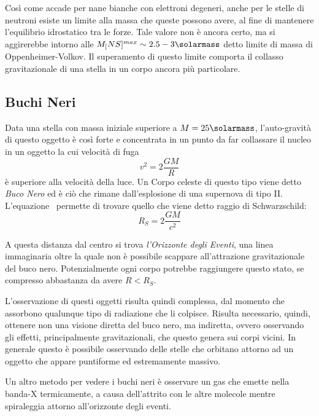 Così come accade per nane bianche con elettroni degeneri, anche per le stelle di neutroni esiste un limite alla massa che queste possono avere, al fine di mantenere l'equilibrio idrostatico tra le forze. Tale valore non è ancora certo, ma si aggirerebbe intorno alle $M_[NS]^{max} \sim 2.5 - 3 \si{\solarmass}$ detto limite di massa di Oppenheimer-Volkov. Il superamento di questo limite comporta il collasso gravitazionale di una stella in un corpo ancora più particolare.\subsection{Buchi Neri}\label{black-holes}

Data una stella con massa iniziale superiore a $M = 25\si{\solarmass}$, l'auto-gravità di questo oggetto è così forte e concentrata in un punto da far collassare il nucleo in un oggetto la cui velocità di fuga
\begin{equation}\label{eq:fuga}
    v^2 = 2 \frac{GM}{R}
\end{equation}
è superiore alla velocità della luce. Un Corpo celeste di questo tipo viene detto \textit{Buco Nero} ed è ciò che rimane dall'esplosione di una supernova di tipo II. L'equazione~ permette di trovare quello che viene detto raggio di Schwarzschild:
\begin{equation}\label{eq:schwarzschild}
    R_S = 2 \frac{GM}{c^2}
\end{equation}

A questa distanza dal centro si trova \textit{l'Orizzonte degli Eventi}, una linea immaginaria oltre la quale non è possibile scappare all'attrazione gravitazionale del buco nero. Potenzialmente ogni corpo potrebbe raggiungere questo stato, se compresso abbastanza da avere $R<R_S$.

L'osservazione di questi oggetti risulta quindi complessa, dal momento che assorbono qualunque tipo di radiazione che li colpisce. Risulta necessario, quindi, ottenere non una visione diretta del buco nero, ma indiretta, ovvero osservando gli effetti, principalmente gravitazionali, che questo genera sui corpi vicini. In generale questo è possibile osservando delle stelle che orbitano attorno ad un oggetto che appare puntiforme ed estremamente massivo.

Un altro metodo per vedere i buchi neri è osservare un gas che emette nella banda-X termicamente, a causa dell'attrito con le altre molecole mentre spiraleggia attorno all'orizzonte degli eventi.

